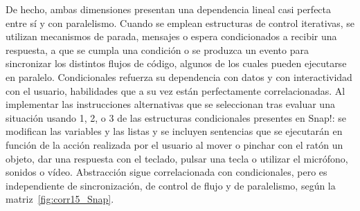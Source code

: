 \documentclass[a4paper, 12pt]{book}
\begin{document}
De hecho, ambas dimensiones presentan una dependencia lineal casi perfecta entre sí y con paralelismo. Cuando se emplean estructuras de control iterativas, se utilizan mecanismos de parada, mensajes o espera condicionados a recibir una respuesta, a que se cumpla una condición o se produzca un evento para sincronizar los distintos flujos de código, algunos de los cuales pueden ejecutarse en paralelo.
Condicionales refuerza su dependencia con datos y con interactividad con el usuario, habilidades que a su vez están perfectamente correlacionadas. Al implementar las instrucciones alternativas que se seleccionan tras evaluar una situación usando 1, 2, o 3 de las estructuras condicionales presentes en Snap!: se modifican las variables y las listas y se incluyen sentencias que se ejecutarán en función de la acción realizada por el usuario al mover o pinchar con el ratón un objeto, dar una respuesta con el teclado, pulsar una tecla o utilizar el micrófono, sonidos o vídeo. Abstracción sigue correlacionada con condicionales, pero es independiente de sincronización, de control de flujo y de paralelismo, según la matriz~\ref{fig:corr15_Snap}.
\end{document}
